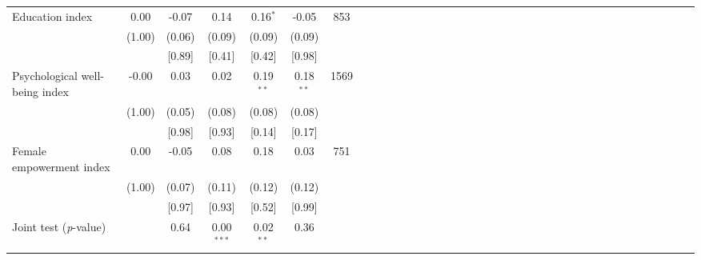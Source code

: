 {\begin{tabular}{l*{6}{SSSSSc}}
Education index&     0.00&    -0.07&     0.14&0.16$^{*}$&    -0.05&      853\\
          &   (1.00)&   (0.06)&   (0.09)&   (0.09)&   (0.09)&         \\
          &         &   [0.89]&   [0.41]&   [0.42]&   [0.98]&         \\
Psychological well-being index&    -0.00&     0.03&     0.02&0.19$^{**}$&0.18$^{**}$&     1569\\
          &   (1.00)&   (0.05)&   (0.08)&   (0.08)&   (0.08)&         \\
          &         &   [0.98]&   [0.93]&   [0.14]&   [0.17]&         \\
Female empowerment index&     0.00&    -0.05&     0.08&     0.18&     0.03&      751\\
          &   (1.00)&   (0.07)&   (0.11)&   (0.12)&   (0.12)&         \\
          &         &   [0.97]&   [0.93]&   [0.52]&   [0.99]&         \\
\midrule Joint test (\emph{p}-value)&         &     0.64&0.00$^{***}$&0.02$^{**}$&     0.36&         \\
\bottomrule
\end{tabular}
}
